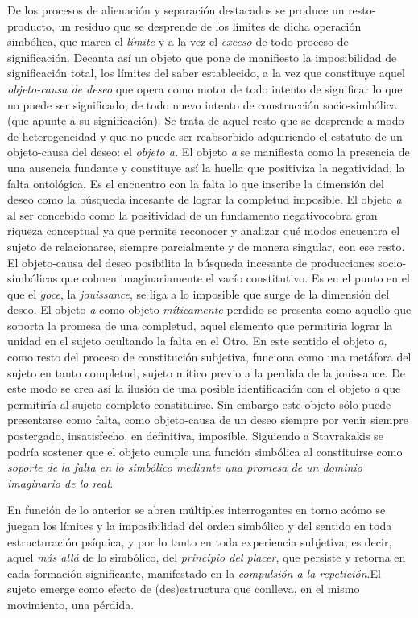 De los procesos de alienación y separación destacados se produce un resto-producto, un residuo que se desprende de los límites de dicha operación simbólica, que marca el \emph{límite} y a la vez el \emph{exceso} de todo proceso de significación. Decanta así un objeto que pone de manifiesto la imposibilidad de significación total, los límites del saber establecido, a la vez que constituye aquel \emph{objeto-causa de deseo} que opera como motor de todo intento de significar lo que no puede ser significado, de todo nuevo intento de construcción socio-simbólica (que apunte a su significación). Se trata de aquel resto que se desprende a modo de heterogeneidad y que no puede ser reabsorbido adquiriendo el estatuto de un objeto-causa del deseo: el \emph{objeto a.} El objeto \emph{a} se manifiesta como la presencia de una ausencia fundante y constituye así la huella que positiviza la negatividad, la falta ontológica. Es el encuentro con la falta lo que inscribe la dimensión del deseo como la búsqueda incesante de lograr la completud imposible. El objeto \emph{a }al ser concebido como la positividad de un fundamento negativocobra gran riqueza conceptual ya que permite reconocer y analizar qué modos encuentra el sujeto de relacionarse, siempre parcialmente y de manera singular, con ese resto. El objeto-causa del deseo posibilita la búsqueda incesante de producciones socio-simbólicas que colmen imaginariamente el vacío constitutivo. Es en el punto en el que el \emph{goce}, la \emph{jouissance}, se liga a lo imposible que surge de la dimensión del deseo. El objeto \emph{a} como objeto \emph{míticamente }perdido se presenta como aquello que soporta la promesa de una completud, aquel elemento que permitiría lograr la unidad en el sujeto ocultando la falta en el Otro. En este sentido el objeto \emph{a, }como resto del proceso de constitución subjetiva, funciona como una metáfora del sujeto en tanto completud, sujeto mítico previo a la perdida de la jouissance. De este modo se crea así la ilusión de una posible identificación con el objeto \emph{a} que permitiría al sujeto completo constituirse. Sin embargo este objeto sólo puede presentarse como falta, como objeto-causa de un deseo siempre por venir siempre postergado, insatisfecho, en definitiva, imposible. Siguiendo a Stavrakakis se podría sostener que el objeto cumple una función simbólica al constituirse como \emph{soporte de la falta en lo simbólico mediante una promesa de un dominio imaginario de lo real. }

En función de lo anterior se abren múltiples interrogantes en torno acómo se juegan los límites y la imposibilidad del orden simbólico y del sentido en toda estructuración psíquica, y por lo tanto en toda experiencia subjetiva; es decir, aquel \emph{más allá} de lo simbólico, del \emph{principio del placer}, que persiste y retorna en cada formación significante, manifestado en la \emph{compulsión a la repetición}.El sujeto emerge como efecto de (des)estructura que conlleva, en el mismo movimiento, una pérdida.

